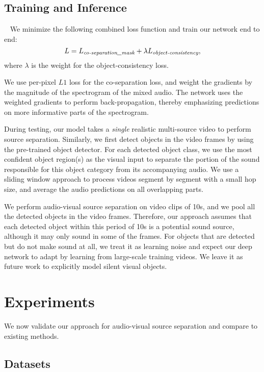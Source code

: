 \documentclass[10pt,twocolumn,letterpaper]{article}
\begin{document}
\subsection{Training and Inference}~\label{sec:trainingAndInference}
We minimize the following combined loss function and train our network end to end:
\begin{equation}
	\vspace{-0.05in}
	L = L_{\emph{co-separation\_mask}} + \lambda L_{\emph{object-consistency}},
	\label{equation7}
\end{equation}
where $\lambda$ is the weight for the object-consistency loss. 

We use per-pixel $L1$ loss for the co-separation loss, and weight the gradients by the magnitude of the spectrogram of the mixed audio. The network uses the weighted gradients to perform back-propagation, thereby emphasizing predictions on more informative parts of the spectrogram.

During testing, our model  takes a \emph{single} realistic multi-source video to perform source separation. Similarly, we first detect objects in the video frames by using the pre-trained object detector. For each detected object class, we use the most confident object region(s) as the visual input to separate the portion of the sound responsible for this object category from its accompanying audio. We use a sliding window approach to process videos segment by segment with a small hop size, and average the audio predictions on all overlapping parts.  

We perform audio-visual source separation on video clips of 10s, and we pool all the detected objects in the video frames. Therefore, our approach assumes that each detected object within this period of 10s is a potential sound source, although it may only sound in some of the frames. For objects that are detected but do not make sound at all, we treat it as learning noise and expect our deep network to adapt by learning from large-scale training videos. We leave it as future work to explicitly model silent visual objects.  \vspace*{-0.05in}
\section{Experiments}\label{sec:results}
\vspace*{-0.05in}
We now validate our approach for audio-visual source separation and compare to existing methods.

\subsection{Datasets}
\end{document}
